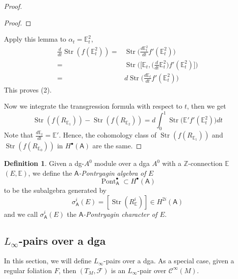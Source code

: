 \documentclass[12pt]{amsart}
\theoremstyle{definition}
\newtheorem{defn}[thm]{Definition}
\theoremstyle{remark}
\numberwithin{equation}{section}
\newcommand{\CF}{{\mathcal F}}
\newcommand{\cinf}{{\mathcal C}^{\infty}}
\newcommand{\Z}{{\mathbb{Z}}}
\newcommand{\1}{{\mathbb{1}}}
\newcommand{\str}{\operatorname{Str}}
\newcommand{\pont}{\operatorname{Pont}}
\begin{document}
\begin{proof}
\begin{proof}
\end{proof}
Apply this lemma to $\alpha_t = \mathbb{E}_t^2$,
\begin{align*}
    \frac{d}{dt} \str(f(\mathbb{E}_t^2)) =& \str\bigg(\frac{d\mathbb{E}_t^2}{dt} f'(\mathbb{E}_t^2)\bigg) \\
    =&\str\bigg(\Big[\mathbb{E}_t,  \Big(\frac{d}{dt}\mathbb{E}_t^2\Big)f'(\mathbb{E}_t^2)\Big]\bigg)\\
    =& d \str\bigg(\frac{d\mathbb{E}_t}{dt} f'(\mathbb{E}_t^2)\bigg)
\end{align*}
This proves (2). 

Now we integrate the transgression formula with respect to $t$, then we get
\begin{equation}
    \str(f(R_{\mathbb{E}_1})) - \str(f(R_{\mathbb{E}_2})) = d\int_0^1 \str\big(\mathbb{E}' f'(\mathbb{E}_t^2)\big) dt
\end{equation}
Note that $\frac{d\mathbb{E}_t}{dt} = \mathbb{E}'$. Hence, the cohomology class of $\str(f(R_{\mathbb{E}_1}))$ and $\str(f(R_{\mathbb{E}_0}))$ in $H^{\bullet}(\mathsf{A})$ are the same.


\end{proof}
\begin{defn}
    Given a dg-$A^0$ module over a dga $A^0$ with a $\Z$-connection $\mathbb{E}$  $(E, \mathbb{E})$, we define the {\it $\mathsf{A}$-Pontryagin algebra of $E$} 
    \begin{equation*}
        \pont^{\bullet}_{\mathsf{A}} \subset H^{\bullet}(\mathsf{A})
    \end{equation*}
    to be the subalgebra generated by 
    \begin{equation*}
        \sigma^i_{\mathsf{A}}(E) = [ \str(R_{\mathbb{E}}^{i})] \in H^{2i}(\mathsf{A})
    \end{equation*}
    and we call $\sigma^i_{\mathsf{A}}(E)$ the {\it $\mathsf{A}$-Pontryagin character of $E$}. 
\end{defn}





\subsection{$L_{\infty}$-pairs over a dga}

In this section, we will define $L_{\infty}$-pairs over a dga. As a special case, given a regular foliation $F$, then $(T_M, \CF)$ is an $L_{\infty}$-pair over $\cinf(M)$.
\end{document}
